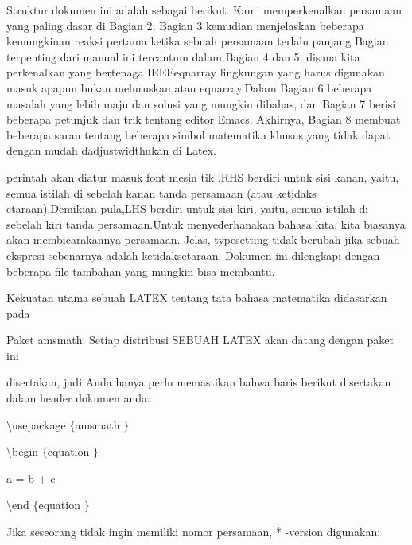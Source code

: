  \hspace*{0.5in} Struktur dokumen ini adalah sebagai berikut. Kami memperkenalkan persamaan yang paling dasar di Bagian 2; Bagian 3 kemudian menjelaskan beberapa kemungkinan reaksi pertama ketika sebuah persamaan terlalu panjang Bagian terpenting dari manual ini tercantum dalam Bagian 4 dan 5: disana kita perkenalkan yang bertenaga IEEEeqnarray lingkungan yang harus digunakan masuk apapun bukan meluruskan atau eqnarray.Dalam Bagian 6 beberapa masalah yang lebih maju dan solusi yang mungkin dibahas, dan Bagian 7 berisi beberapa petunjuk dan trik tentang editor Emacs. Akhirnya, Bagian 8 membuat beberapa saran tentang beberapa simbol matematika khusus yang tidak dapat dengan mudah dadjustwidthukan di Latex. \par
\noindent 
perintah akan diatur masuk font mesin tik .RHS berdiri untuk sisi kanan, yaitu, semua istilah di sebelah kanan tanda persamaan (atau ketidaks etaraan).Demikian pula,LHS berdiri untuk sisi kiri, yaitu, semua istilah di sebelah kiri tanda persamaan.Untuk menyederhanakan bahasa kita, kita biasanya akan membicarakannya persamaan. Jelas, typesetting tidak berubah jika sebuah ekspresi sebenarnya adalah ketidaksetaraan. Dokumen ini dilengkapi dengan beberapa file tambahan yang mungkin bisa membantu. \par
\noindent 
 \hspace*{0.5in} Kekuatan utama sebuah LATEX tentang tata bahasa matematika didasarkan pada \par
\noindent 
Paket amsmath. Setiap distribusi SEBUAH LATEX akan datang dengan paket ini \par
\noindent 
disertakan, jadi Anda hanya perlu memastikan bahwa baris berikut disertakan dalam header dokumen anda: \par
\noindent 
\vspace{10pt}
\noindent 
 $  \setminus  $usepackage $  \{  $amsmath $  \}  $ \par
\noindent 
\vspace{12pt}
\noindent 
 $  \setminus  $begin $  \{  $equation $  \}  $ \par
\vspace{12pt}
\noindent 
a = b + c \par
\vspace{12pt}
\noindent 
 $  \setminus  $end $  \{  $equation $  \}  $ \par
\vspace{12pt}
\noindent 
Jika seseorang tidak ingin memiliki nomor persamaan, * -version digunakan: \par

